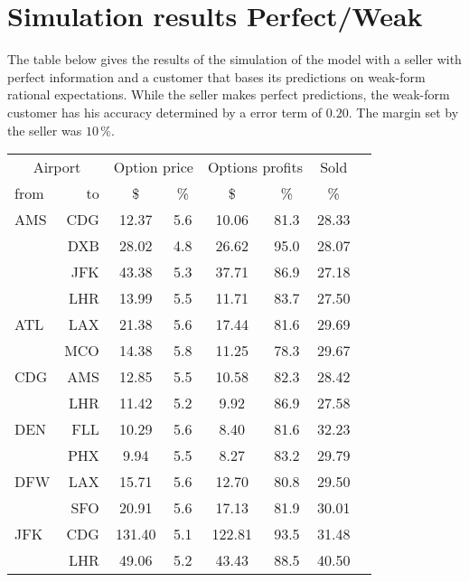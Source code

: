 \chapter{Simulation results Perfect/Weak}
\label{app:SimulationResultsPerfectWeak}
The table below gives the results of the simulation of the model with a seller with perfect information and a customer that bases its predictions on weak-form rational expectations. While the seller makes perfect predictions, the weak-form customer has his accuracy determined by a error term of $0.20$. The margin set by the seller was $10\,\%$.
\\[2em]
\begin{table}[h]
    \small
    \begin{center}
        \begin{tabular}{l r c c c c c c}
            \toprule
            \multicolumn{2}{c}{Airport}  & \multicolumn{2}{c}{Option price} & \multicolumn{2}{c}{Options profits}  &  Sold  \\[.4ex]
            from  &  to  &  \$  & \%  &  \$  & \%  & \%  \\
            \midrule
AMS  &  CDG &  12.37  &    5.6  &  10.06  &   81.3  &  28.33  \\
     &  DXB &  28.02  &    4.8  &  26.62  &   95.0  &  28.07  \\
     &  JFK &  43.38  &    5.3  &  37.71  &   86.9  &  27.18  \\
     &  LHR &  13.99  &    5.5  &  11.71  &   83.7  &  27.50  \\[.5ex]
ATL  &  LAX &  21.38  &    5.6  &  17.44  &   81.6  &  29.69  \\
     &  MCO &  14.38  &    5.8  &  11.25  &   78.3  &  29.67  \\[.5ex]
CDG  &  AMS &  12.85  &    5.5  &  10.58  &   82.3  &  28.42  \\
     &  LHR &  11.42  &    5.2  &   9.92  &   86.9  &  27.58  \\[.5ex]
DEN  &  FLL &  10.29  &    5.6  &   8.40  &   81.6  &  32.23  \\
     &  PHX &   9.94  &    5.5  &   8.27  &   83.2  &  29.79  \\[.5ex]
DFW  &  LAX &  15.71  &    5.6  &  12.70  &   80.8  &  29.50  \\
     &  SFO &  20.91  &    5.6  &  17.13  &   81.9  &  30.01  \\[.5ex]
JFK  &  CDG &  131.40  &    5.1  &  122.81  &   93.5  &  31.48  \\
     &  LHR &  49.06  &    5.2  &  43.43  &   88.5  &  40.50  \\[.5ex]

\end{tabular}
\end{center}
\end{table}
